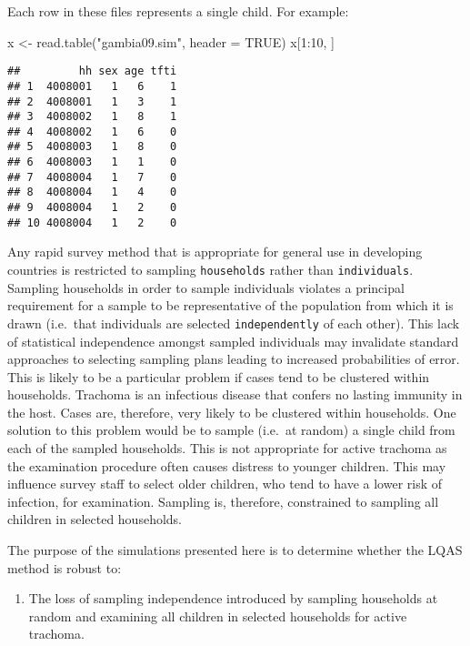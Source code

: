 \documentclass[
  12pt,
  a4paper]{book}
\newenvironment{Shaded}{\begin{snugshade}}{\end{snugshade}}
\newcommand{\AttributeTok}[1]{\textcolor[rgb]{0.77,0.63,0.00}{#1}}
\newcommand{\ConstantTok}[1]{\textcolor[rgb]{0.00,0.00,0.00}{#1}}
\newcommand{\DecValTok}[1]{\textcolor[rgb]{0.00,0.00,0.81}{#1}}
\newcommand{\FunctionTok}[1]{\textcolor[rgb]{0.00,0.00,0.00}{#1}}
\newcommand{\NormalTok}[1]{#1}
\newcommand{\OtherTok}[1]{\textcolor[rgb]{0.56,0.35,0.01}{#1}}
\newcommand{\SpecialCharTok}[1]{\textcolor[rgb]{0.00,0.00,0.00}{#1}}
\newcommand{\StringTok}[1]{\textcolor[rgb]{0.31,0.60,0.02}{#1}}
\providecommand{\tightlist}{%
  \setlength{\itemsep}{0pt}\setlength{\parskip}{0pt}}
\begin{document}
Each row in these files represents a single child. For example:

\begin{Shaded}
\begin{Highlighting}[]
\NormalTok{x }\OtherTok{\textless{}{-}} \FunctionTok{read.table}\NormalTok{(}\StringTok{"gambia09.sim"}\NormalTok{, }\AttributeTok{header =} \ConstantTok{TRUE}\NormalTok{)}
\NormalTok{x[}\DecValTok{1}\SpecialCharTok{:}\DecValTok{10}\NormalTok{, ]}
\end{Highlighting}
\end{Shaded}

\begin{verbatim}
##         hh sex age tfti
## 1  4008001   1   6    1
## 2  4008001   1   3    1
## 3  4008002   1   8    1
## 4  4008002   1   6    0
## 5  4008003   1   8    0
## 6  4008003   1   1    0
## 7  4008004   1   7    0
## 8  4008004   1   4    0
## 9  4008004   1   2    0
## 10 4008004   1   2    0
\end{verbatim}

Any rapid survey method that is appropriate for general use in developing countries is restricted to sampling \texttt{households} rather than \texttt{individuals}. Sampling households in order to sample individuals violates a principal requirement for a sample to be representative of the population from which it is drawn (i.e.~that individuals are selected \texttt{independently} of each other). This lack of statistical independence amongst sampled individuals may invalidate standard approaches to selecting sampling plans leading to increased probabilities of error. This is likely to be a particular problem if cases tend to be clustered within households. Trachoma is an infectious disease that confers no lasting immunity in the host. Cases are, therefore, very likely to be clustered within households. One solution to this problem would be to sample (i.e.~at random) a single child from each of the sampled households. This is not appropriate for active trachoma as the examination procedure often causes distress to younger children. This may influence survey staff to select older children, who tend to have a lower risk of infection, for examination. Sampling is, therefore, constrained to sampling all children in selected households.

The purpose of the simulations presented here is to determine whether the LQAS method is robust to:

\begin{enumerate}
\def\labelenumi{\arabic{enumi}.}
\tightlist
\item
  The loss of sampling independence introduced by sampling households at random and examining all children in selected households for active trachoma.
\end{enumerate}
\end{document}
